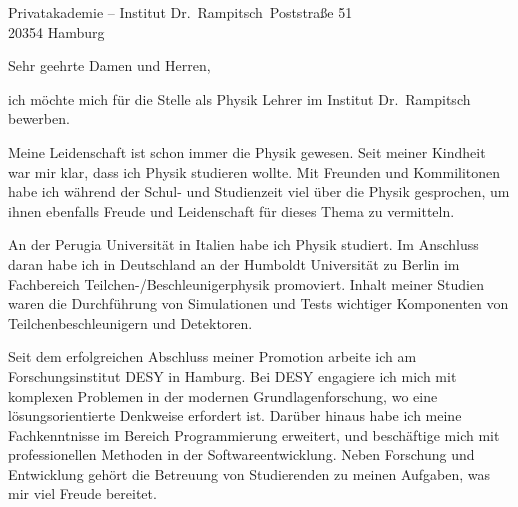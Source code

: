 \documentclass[ebner,paper=a4,fontsize=11pt,ngerman,BCOR=10mm]{scrlttr2}%
\begin{document}
\pagestyle{empty}

\begin{letter}{ Privatakademie – Institut Dr.~Rampitsch\
Poststra{\ss}e 51\\ 
20354 Hamburg}


\opening{Sehr geehrte Damen und Herren,} 

ich m{\"o}chte mich f{\"u}r die Stelle als Physik Lehrer im Institut
Dr.~Rampitsch bewerben.

Meine Leidenschaft ist schon immer die Physik
gewesen. Seit meiner Kindheit war mir klar, dass ich Physik studieren wollte.
Mit Freunden und Kommilitonen habe ich w{\"a}hrend der Schul- und Studienzeit
viel {\"u}ber die Physik gesprochen, um ihnen ebenfalls Freude und Leidenschaft
f{\"u}r dieses Thema zu vermitteln.


An der Perugia Universit{\"a}t in Italien habe ich Physik studiert. Im
Anschluss daran habe ich in Deutschland an der Humboldt Universit{\"a}t zu
Berlin im Fachbereich Teilchen-/Beschleunigerphysik promoviert. Inhalt meiner
Studien waren die Durchf{\"u}hrung von Simulationen und Tests wichtiger
Komponenten von Teilchenbeschleunigern und Detektoren.

Seit dem erfolgreichen Abschluss meiner Promotion arbeite ich am
Forschungsinstitut DESY in Hamburg. Bei DESY engagiere ich mich mit komplexen
Problemen in der modernen Grundlagenforschung, wo eine l{\"o}sungsorientierte
Denkweise erfordert ist. Dar{\"u}ber hinaus habe ich meine Fachkenntnisse im
Bereich Programmierung erweitert, und besch{\"a}ftige mich mit professionellen
Methoden in der Softwareentwicklung. Neben Forschung und Entwicklung geh{\"o}rt
die Betreuung von Studierenden zu meinen Aufgaben, was mir viel Freude bereitet.




\end{letter}
\end{document}

